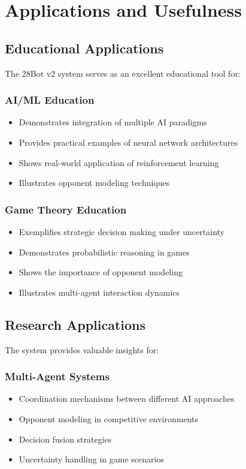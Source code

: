 \documentclass[conference]{IEEEtran}
\begin{document}
\section{Applications and Usefulness}

\subsection{Educational Applications}

The 28Bot v2 system serves as an excellent educational tool for:

\subsubsection{AI/ML Education}
\begin{itemize}
    \item Demonstrates integration of multiple AI paradigms
    \item Provides practical examples of neural network architectures
    \item Shows real-world application of reinforcement learning
    \item Illustrates opponent modeling techniques
\end{itemize}

\subsubsection{Game Theory Education}
\begin{itemize}
    \item Exemplifies strategic decision making under uncertainty
    \item Demonstrates probabilistic reasoning in games
    \item Shows the importance of opponent modeling
    \item Illustrates multi-agent interaction dynamics
\end{itemize}

\subsection{Research Applications}

The system provides valuable insights for:

\subsubsection{Multi-Agent Systems}
\begin{itemize}
    \item Coordination mechanisms between different AI approaches
    \item Opponent modeling in competitive environments
    \item Decision fusion strategies
    \item Uncertainty handling in game scenarios
\end{itemize}
\end{document}
